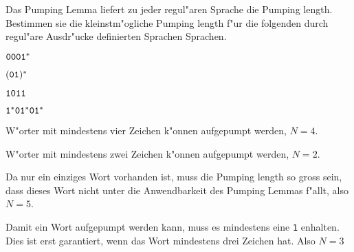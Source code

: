 Das Pumping Lemma liefert zu jeder regul"aren Sprache die Pumping length.
Bestimmen sie die kleinstm"ogliche Pumping length f"ur die folgenden
durch regul"are Ausdr"ucke definierten Sprachen
Sprachen.
\begin{teilaufgaben}
\item ${\tt 0001}^*$
\item $({\tt 01})^*$
\item ${\tt 1011}$
\item ${\tt 1}^*{\tt 01}^*{\tt 01}^*$
\end{teilaufgaben}

\begin{loesung}
\begin{teilaufgaben}
\item W"orter mit mindestens vier Zeichen k"onnen aufgepumpt werden,
$N=4$.
\item W"orter mit mindestens zwei Zeichen k"onnen aufgepumpt werden,
$N=2$.
\item Da nur ein einziges Wort vorhanden ist, muss die Pumping length
so gross sein, dass dieses Wort nicht unter die Anwendbarkeit des
Pumping Lemmas f"allt, also $N=5$.
\item Damit ein Wort aufgepumpt werden kann, muss es mindestens eine
{\tt 1} enhalten. Dies ist erst garantiert, wenn das Wort  mindestens
drei Zeichen hat. Also $N=3$
\end{teilaufgaben}
\end{loesung}
